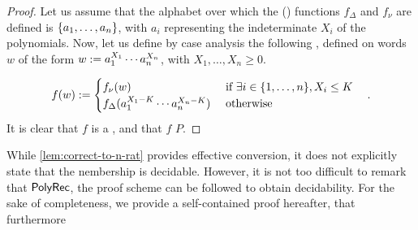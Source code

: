 \begin{proof}
    Let us assume that the alphabet over which the () functions
    $f_\Delta$ and $f_\nu$ are defined is $\mathopen{\{} a_1, \dots, a_n \mathclose{\}}$, with $a_i$
    representing the indeterminate $X_i$ of the polynomials. Now, let us define
    by case analysis the following  , defined on words $w$ of the form $w \mathrel{:=}
    a_1^{X_1} \cdots a_n^{X_n}$, with $X_1, \dots, X_n \geq 0$.

    \begin{equation*}
        f(w) \mathrel{:=}
        \begin{cases}
            f_\nu(w) & \text{ if } \exists i \in \mathopen{\{} 1, \dots, n \mathclose{\}}, X_i \leq K \\
            f_\Delta(a_1^{X_1 - K} \cdots a_n^{X_n - K}) & \text{ otherwise }
        \end{cases}
        \quad .
    \end{equation*}
    It is clear that
    $f$ is a  ,
    and that
    $f$  $P$.
\end{proof}

While \cref{lem:correct-to-n-rat} provides effective conversion, it does not
explicitly state that the nembership is decidable. However, it is not too
difficult to remark that $\mathsf{PolyRec}$, the proof scheme can be followed to
obtain decidability. For the sake of completeness, we provide a self-contained
proof hereafter, that furthermore 

